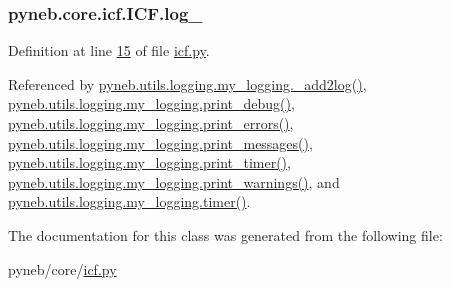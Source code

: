 \hypertarget{classpyneb_1_1core_1_1icf_1_1_i_c_f_a50ae74d7192ec52a1249a675f963461e}{
\subsubsection[{log\-\_\-}]{\setlength{\rightskip}{0pt plus 5cm}pyneb.\-core.\-icf.\-I\-C\-F.\-log\-\_\-}}\label{classpyneb_1_1core_1_1icf_1_1_i_c_f_a50ae74d7192ec52a1249a675f963461e}


Definition at line \hyperlink{icf_8py_source_l00015}{15} of file \hyperlink{icf_8py_source}{icf.\-py}.



Referenced by \hyperlink{logging_8py_source_l00059}{pyneb.\-utils.\-logging.\-my\-\_\-logging.\-\_\-add2log()}, \hyperlink{logging_8py_source_l00157}{pyneb.\-utils.\-logging.\-my\-\_\-logging.\-print\-\_\-debug()}, \hyperlink{logging_8py_source_l00149}{pyneb.\-utils.\-logging.\-my\-\_\-logging.\-print\-\_\-errors()}, \hyperlink{logging_8py_source_l00133}{pyneb.\-utils.\-logging.\-my\-\_\-logging.\-print\-\_\-messages()}, \hyperlink{logging_8py_source_l00165}{pyneb.\-utils.\-logging.\-my\-\_\-logging.\-print\-\_\-timer()}, \hyperlink{logging_8py_source_l00141}{pyneb.\-utils.\-logging.\-my\-\_\-logging.\-print\-\_\-warnings()}, and \hyperlink{logging_8py_source_l00115}{pyneb.\-utils.\-logging.\-my\-\_\-logging.\-timer()}.



The documentation for this class was generated from the following file\-:\begin{DoxyCompactItemize}
\item 
pyneb/core/\hyperlink{icf_8py}{icf.\-py}\end{DoxyCompactItemize}
